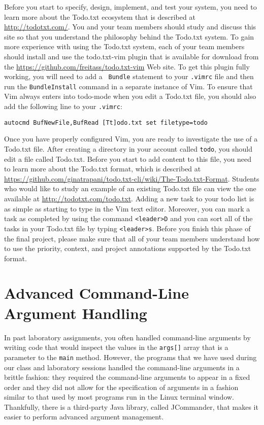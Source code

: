 Before you start to specify, design, implement, and test your system, you need to learn more about the Todo.txt
ecosystem that is described at \url{http://todotxt.com/}. You and your team members should study and discuss this site
so that you understand the philosophy behind the Todo.txt system. To gain more experience with using the Todo.txt
system, each of your team members should install and use the todo.txt-vim plugin that is available for download from the
\url{https://github.com/freitass/todo.txt-vim} Web site. To get this plugin fully working, you will need to add a {\tt
Bundle} statement to your {\tt .vimrc} file and then run the {\tt BundleInstall} command in a separate instance of Vim.
To ensure that Vim always enters into todo-mode when you edit a Todo.txt file, you should also add the following line to
your {\tt .vimrc}:

{\tt autocmd BufNewFile,BufRead [Tt]odo.txt set filetype=todo}

Once you have properly configured Vim, you are ready to investigate the use of a Todo.txt file. After creating a
directory in your account called {\tt todo}, you should edit a file called Todo.txt.  Before you start to add content to
this file, you need to learn more about the Todo.txt format, which is described at
\url{https://github.com/ginatrapani/todo.txt-cli/wiki/The-Todo.txt-Format}. Students who would like to study an example
of an existing Todo.txt file can view the one available at \url{http://todotxt.com/todo.txt}. Adding a new task to your
todo list is as simple as starting to type in the Vim text editor.  Moreover, you can mark a task as completed by using
the command {\tt <leader>D} and you can sort all of the tasks in your Todo.txt file by typing {\tt <leader>s}. Before
you finish this phase of the final project, please make sure that all of your team members understand how to use the
priority, context, and project annotations supported by the Todo.txt format.

\section*{Advanced Command-Line Argument Handling}

In past laboratory assignments, you often handled command-line arguments by writing code that would inspect the values
in the {\tt args[]} array that is a parameter to the {\tt main} method.  However, the programs that we have used during
our class and laboratory sessions handled the command-line arguments in a brittle fashion: they required the
command-line arguments to appear in a fixed order and they did not allow for the specification of arguments in a fashion
similar to that used by most programs run in the Linux terminal window. Thankfully, there is a third-party Java library,
called JCommander, that makes it easier to perform advanced argument management.

